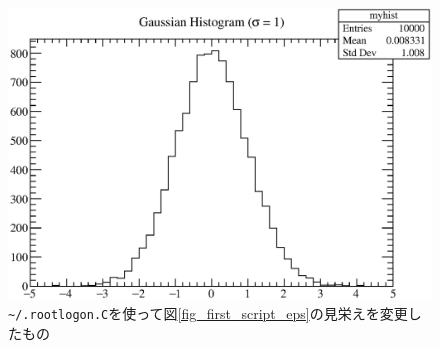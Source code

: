 

\begin{figure}
  \centering
  \includegraphics[width=12cm,clip]{fig/first_script_mod.eps}
  \caption{\texttt{\~{}/.rootlogon.C}を使って図\ref{fig_first_script_eps}の見栄えを変更したもの}
  \label{fig_first_script_mod_eps}
\end{figure}
